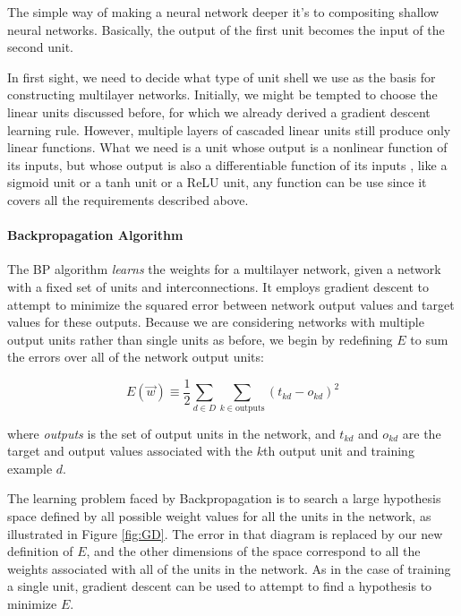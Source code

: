 \documentclass{tufte-handout}
\begin{document}
The simple way of making a neural network deeper it's to compositing shallow neural networks. Basically, the output of the first unit becomes the input of the second unit. 

In first sight, we need to decide what type of unit shell we use as the basis for constructing multilayer networks. Initially, we might be tempted to choose the linear units discussed before, for which we already derived a gradient descent learning rule. However, multiple layers of cascaded linear units still produce only linear functions. What we need is a unit whose output is a nonlinear function of its inputs, but whose output is also a differentiable function of its inputs , like a sigmoid unit or a tanh unit or a ReLU unit, any function can be use since it covers all the requirements described above.



\paragraph{Backpropagation Algorithm }
The BP algorithm \textit{learns} the weights for a multilayer network, given a network with a fixed set of units and interconnections. It employs gradient descent to attempt to minimize the squared error between network output values and target values for these outputs.
Because we are considering networks with multiple output units rather than single units as before, we begin by redefining $E$ to sum the errors over all of the network output units:

\begin{equation}
    E(\Vec{w}) \equiv \frac{1}{2} \sum_{d \in D} \sum_{k \in \text{outputs}} (t_{kd} - o_{kd})^2
\end{equation}

where \textit{outputs} is the set of output units in the network, and $t_{kd}$ and $o_{kd}$ are the target and output values associated with the $k$th output unit and training example $d$.

The learning problem faced by Backpropagation is to search a large hypothesis space defined by all possible weight values for all the units in the network, as illustrated in Figure \ref{fig:GD}. The error in that diagram is replaced by our new definition of $E$, and the other dimensions of the space correspond to all the weights associated with all of the units in the network. As in the case of training a single unit, gradient descent can be used to attempt to find a hypothesis to minimize $E$.
\end{document}
